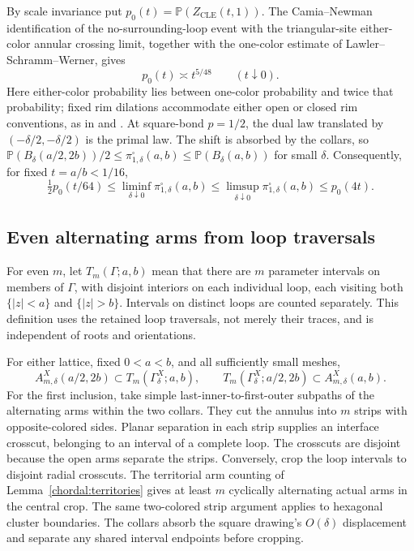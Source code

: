 By scale invariance put $p_0(t)=\mathbb P(Z_{\mathrm{CLE}}(t,1))$.
The Camia--Newman identification of the no-surrounding-loop event with
the triangular-site either-color annular crossing limit, together with
the one-color estimate of Lawler--Schramm--Werner, gives
\begin{equation}\label{perc:cle-one}
 p_0(t)\asymp t^{5/48}\qquad(t\downarrow0).
\end{equation}
Here either-color probability lies between one-color probability and
twice that probability; fixed rim dilations accommodate either open
or closed rim conventions, as in
\citet[Theorem~2 and Section~1.1]{CamiaNewman2006Full} and
\citet[Theorem~1.2 and Section~3]{LSW2002OneArm}.
At square-bond $p=1/2$, the dual law translated by
$(-\delta/2,-\delta/2)$ is the primal law.  The shift is absorbed by
the collars, so
$\mathbb P(B_\delta(a/2,2b))/2\le\pi^\square_{1,\delta}(a,b)
\le\mathbb P(B_\delta(a,b))$ for small $\delta$.  Consequently, for
fixed $t=a/b<1/16$,
\begin{equation}\label{perc:one-envelope}
 \tfrac12p_0(t/64)
 \le\liminf_{\delta\downarrow0}\pi^\square_{1,\delta}(a,b)
 \le\limsup_{\delta\downarrow0}\pi^\square_{1,\delta}(a,b)
 \le p_0(4t).
\end{equation}

\subsection{Even alternating arms from loop traversals}
For even $m$, let $T_m(\Gamma;a,b)$ mean that there are $m$ parameter
intervals on members of $\Gamma$, with disjoint interiors on each
individual loop, each visiting both $\{|z|<a\}$ and $\{|z|>b\}$.
Intervals on distinct loops are counted separately.  This definition
uses the retained loop traversals, not merely their traces, and is
independent of roots and orientations.

For either lattice, fixed $0<a<b$, and all sufficiently small meshes,
\begin{equation}\label{perc:even-lattice}
 A^X_{m,\delta}(a/2,2b)
 \subset T_m(\Gamma^X_\delta;a,b),\qquad
 T_m(\Gamma^X_\delta;a/2,2b)
 \subset A^X_{m,\delta}(a,b).
\end{equation}
For the first inclusion, take simple last-inner-to-first-outer
subpaths of the alternating arms within the two collars.  They cut
the annulus into $m$ strips with opposite-colored
sides.  Planar separation in each strip supplies an interface
crosscut, belonging to an interval of a complete loop.  The crosscuts
are disjoint because the open arms separate the strips.  Conversely,
crop the loop intervals to disjoint radial crosscuts.  The territorial
arm counting of Lemma~\ref{chordal:territories} gives at least $m$
cyclically alternating actual arms in the central crop.  The same
two-colored strip argument applies to hexagonal cluster boundaries.
The collars absorb the square drawing's $O(\delta)$ displacement and
separate any shared interval endpoints before cropping.

